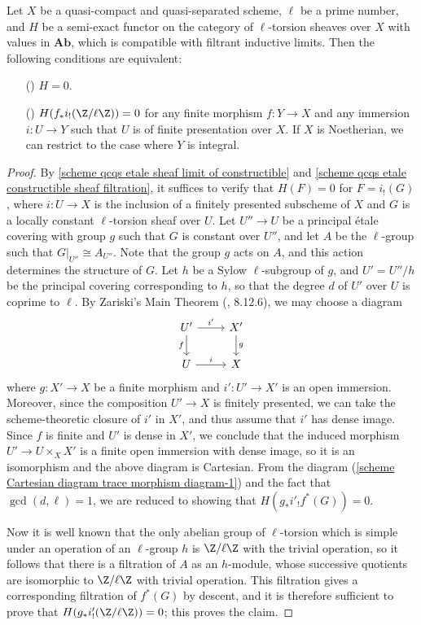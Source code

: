 \begin{proposition}\label{scheme qcqs semi-exact functor on etale zero iff}
Let $X$ be a quasi-compact and quasi-separated scheme, $\ell$ be a prime number, and $H$ be a semi-exact functor on the category of $\ell$-torsion sheaves over $X$ with values in $\mathbf{Ab}$, which is compatible with filtrant inductive limits. Then the following conditions are equivalent:
\begin{enumerate} 
    \item[(\rmnum{1})] $H=0$.
    \item[(\rmnum{2})] $H(f_*i_!(\Z/\ell\Z))=0$ for any finite morphism $f:Y\to X$ and any immersion $i:U\to Y$ such that $U$ is of finite presentation over $X$. If $X$ is Noetherian, we can restrict to the case where $Y$ is integral.
\end{enumerate}
 
\end{proposition}
\begin{proof}
By \cref{scheme qcqs etale sheaf limit of constructible} and \cref{scheme qcqs etale constructible sheaf filtration}, it suffices to verify that $H(F)=0$ for $F=i_!(G)$, where $i:U\to X$ is the inclusion of a finitely presented subscheme of $X$ and $G$ is a locally constant $\ell$-torsion sheaf over $U$. Let $U''\to U$ be a principal \'etale covering with group $g$ such that $G$ is constant over $U''$, and let $A$ be the $\ell$-group such that $G|_{U''}\cong A_{U''}$. Note that the group $g$ acts on $A$, and this action determines the structure of $G$. Let $h$ be a Sylow $\ell$-subgroup of $g$, and $U'=U''/h$ be the principal covering corresponding to $h$, so that the degree $d$ of $U'$ over $U$ is coprime to $\ell$. By Zariski's Main Theorem (\cite{EGA4-3}, 8.12.6), we may choose a diagram
\[\begin{tikzcd}
U'\ar[d,swap,"f"]\ar[r,"i'"]&X'\ar[d,"g"]\\
U\ar[r,"i"]&X
\end{tikzcd}\]
where $g:X'\to X$ be a finite morphism and $i':U'\to X'$ is an open immersion. Moreover, since the composition $U'\to X$ is finitely presented, we can take the scheme-theoretic closure of $i'$ in $X'$, and thus assume that $i'$ has dense image. Since $f$ is finite and $U'$ is dense in $X'$, we conclude that the induced morphism $U'\to U\times_XX'$ is a finite open immersion with dense image, so it is an isomorphism and the above diagram is Cartesian. From the diagram (\ref{scheme Cartesian diagram trace morphism diagram-1}) and the fact that $\gcd(d,\ell)=1$, we are reduced to showing that $H(g_*i'_!f^*(G))=0$.\par
Now it is well known that the only abelian group of $\ell$-torsion which is simple under an operation of an $\ell$-group $h$ is $\Z/\ell\Z$ with the trivial operation, so it follows that there is a filtration of $A$ as an $h$-module, whose successive quotients are isomorphic to $\Z/\ell\Z$ with trivial operation. This filtration gives a corresponding filtration of $f^*(G)$ by descent, and it is therefore sufficient to prove that $H(g_*i'_!(\Z/\ell\Z))=0$; this proves the claim.
\end{proof}

